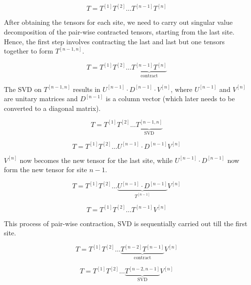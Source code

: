 \begin{equation}
	T = T^{[1]} T ^{[2]} \dots T^{[n-1]}  T^{[n]}
\end{equation}

After obtaining the tensors for each site, we need to carry out singular value decomposition of the pair-wise contracted tensors, starting from the last site. Hence, the first step involves contracting the last and last but one tensors together to form $T^{[n-1, n]}$.

\begin{equation}
	T = T^{[1]} T ^{[2]} \dots \underbrace{ T^{[n-1]}  T^{[n]} }_\text{contract}
\end{equation}

The SVD on $T^{[n-1, n]}$ results in $U^{[n-1]}\cdot D^{[n-1]} \cdot V^{[n]}$, where $U^{[n-1]}$ and $V^{[n]}$ are unitary matrices and $D^{[n-1]}$ is a column vector (which later needs to be converted to a diagonal matrix).

\begin{equation}
	T = T^{[1]} T ^{[2]} \dots \underbrace{ T^{[n-1, n]} }_\text{SVD}
\end{equation}


\begin{equation}
	T = T^{[1]} T ^{[2]} \dots U^{[n-1]}\cdot D^{[n-1]} V^{[n]}
\end{equation}


$V^{[n]}$ now becomes the new tensor for the last site, while $U^{[n-1]}\cdot D^{[n-1]} $ now form the new tensor for site $n-1$.

\begin{equation}
	T = T^{[1]} T ^{[2]} \dots \underbrace{ U^{[n-1]}\cdot D^{[n-1]} }_{T^{[n-1]}} V^{[n]}
\end{equation}


\begin{equation}
	T = T^{[1]} T ^{[2]} \dots T^{[n-1]} V^{[n]}
\end{equation}

This process of pair-wise contraction, SVD is sequentially carried out till the first site. 

\begin{equation}
	T = T^{[1]} T ^{[2]} \dots \underbrace{T^{[n-2]}T^{[n-1]} }_\text{contract} V^{[n]}
\end{equation}


\begin{equation}
	T = T^{[1]} T ^{[2]} \dots \underbrace{T^{[n-2,n-1] }}_\text{SVD} V^{[n]}
\end{equation}


